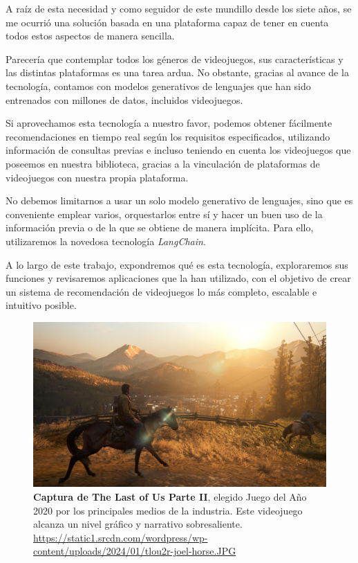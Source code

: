 A raíz de esta necesidad y como seguidor de este mundillo desde los siete años, se me ocurrió una solución basada en una plataforma capaz de tener en cuenta todos estos aspectos de manera sencilla.  


Parecería que contemplar todos los géneros de videojuegos, sus características y las distintas plataformas es una tarea ardua. No obstante, gracias al avance de la tecnología, contamos con modelos generativos de lenguajes que han sido entrenados con millones de datos, incluidos videojuegos.  

Si aprovechamos esta tecnología a nuestro favor, podemos obtener fácilmente recomendaciones en tiempo real según los requisitos especificados, utilizando información de consultas previas e incluso teniendo en cuenta los videojuegos que poseemos en nuestra biblioteca, gracias a la vinculación de plataformas de videojuegos con nuestra propia plataforma.  


No debemos limitarnos a usar un solo modelo generativo de lenguajes, sino que es conveniente emplear varios, orquestarlos entre sí y hacer un buen uso de la información previa o de la que se obtiene de manera implícita. Para ello, utilizaremos la novedosa tecnología \textit{LangChain}.  

A lo largo de este trabajo, expondremos qué es esta tecnología, exploraremos sus funciones y revisaremos aplicaciones que la han utilizado, con el objetivo de crear un sistema de recomendación de videojuegos lo más completo, escalable e intuitivo posible.  

\begin{figure}[H]
    \centering
    \includegraphics[width=1\linewidth]{imagenes/tlou2.jpg}
    \caption[\textbf{Captura de The Last of Us Parte II}.]{\textbf{Captura de The Last of Us Parte II}, elegido Juego del Año 2020 por los principales medios de la industria. Este videojuego alcanza un nivel gráfico y narrativo sobresaliente. \href{https://static1.srcdn.com/wordpress/wp-content/uploads/2024/01/tlou2r-joel-horse.JPG}{https://static1.srcdn.com/wordpress/wp-content/uploads/2024/01/tlou2r-joel-horse.JPG}}
    \label{foto-the-last-of-us-2}
\end{figure}



